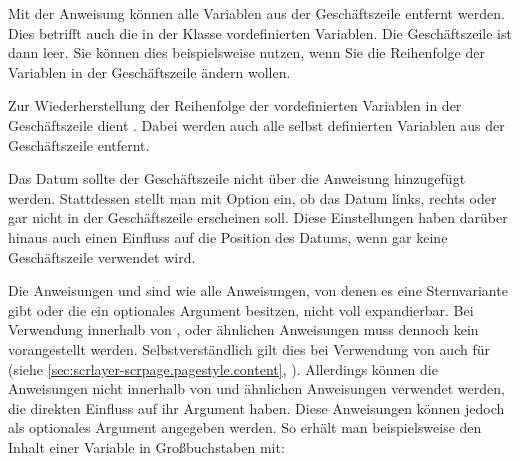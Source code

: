 Mit der Anweisung  können alle Variablen aus der
Geschäftszeile entfernt werden. Dies betrifft auch die in der Klasse
vordefinierten Variablen. Die Geschäftszeile ist dann leer. Sie können dies
beispielsweise nutzen, wenn Sie die Reihenfolge der Variablen in der
Geschäftszeile ändern wollen.

Zur Wiederherstellung der Reihenfolge der vordefinierten Variablen in der
Geschäftszeile dient . Dabei werden auch alle
selbst definierten Variablen aus der Geschäftszeile entfernt.

Das Datum sollte der Geschäftszeile nicht über die
Anweisung  hinzugefügt werden. Stattdessen stellt man
mit Option %
%
%
%
 ein, ob das Datum links, rechts oder
gar nicht in der Geschäftszeile erscheinen soll. Diese Einstellungen haben
darüber hinaus auch einen Einfluss auf die Position des Datums, wenn gar keine
Geschäftszeile verwendet wird.%
%
\EndIndexGroup


\begin{Declaration}
\end{Declaration}
Die Anweisungen  und
 sind wie alle Anweisungen, von denen es
eine Sternvariante gibt oder die ein optionales Argument besitzen, nicht voll
expandierbar.  Bei Verwendung innerhalb von
,
 oder ähnlichen
Anweisungen muss dennoch kein  vorangestellt
werden. Selbstverständlich gilt dies bei Verwendung von
\hyperref[cha:scrlayer-scrpage]{}%
 auch für
 (siehe
\autoref{sec:scrlayer-scrpage.pagestyle.content},
).  Allerdings
können die Anweisungen nicht innerhalb von
und ähnlichen Anweisungen verwendet werden, die direkten Einfluss auf ihr
Argument haben. Diese Anweisungen können jedoch als optionales Argument
angegeben werden. So erhält man beispielsweise den Inhalt einer Variable in
Großbuchstaben mit:
\begin{lstcode}[escapeinside=><]
\end{lstcode}
%
\EndIndexGroup


